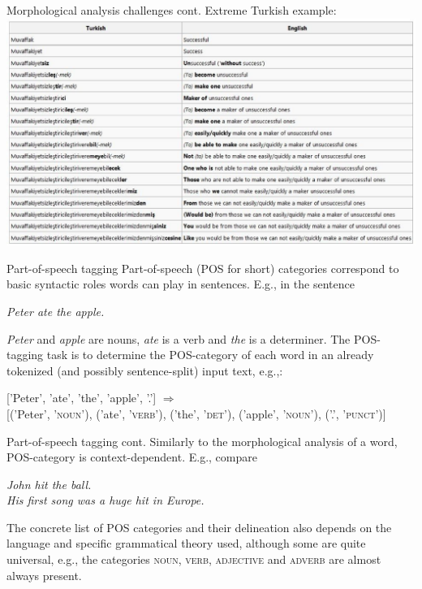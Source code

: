 \documentclass[style=upen, size=14pt]{powerdot}
\newcommand{\gold}{\color{arany}}
\begin{document}
\begin{slide}[toc=]{Morphological analysis challenges cont.}
  Extreme Turkish example:\smallskip\\
    \includegraphics[width=1\textwidth]{figures/turk.eps}
\end{slide}

\begin{slide}[toc=POS tagging]{Part-of-speech tagging}
  Part-of-speech (POS for short) categories correspond to basic syntactic roles
  words can play in sentences. E.g., in the sentence\bigskip

  \emph{Peter ate the apple.}\bigskip

  \emph{Peter} and \emph{apple} are nouns, \emph{ate} is a verb and \emph{the}
  is a determiner. The POS-tagging task is to determine the POS-category of each
  word in an already tokenized (and possibly sentence-split) input text,
  e.g.,:\bigskip

  ['Peter', 'ate', 'the', 'apple', '.'] $\Rightarrow$ \\
  
  [('Peter', \textsc{'noun'}), ('ate', \textsc{'verb'}), ('the',
  \textsc{'det'}), ('apple', \textsc{'noun'}), ('.', \textsc{'punct'})]
\end{slide}

\begin{slide}[toc=]{Part-of-speech tagging cont.}
  Similarly to the morphological analysis of a word, POS-category is
  context-dependent. E.g., compare\bigskip

  \emph{John {\gold hit} the ball.}\\
  \emph{His first song was a huge {\gold hit} in Europe.}\bigskip

  The concrete list of POS categories and their delineation also depends on the
  language and specific grammatical theory used, although some are quite
  universal, e.g., the categories \textsc{noun}, \textsc{verb},
  \textsc{adjective} and \textsc{adverb} are almost always present.
\end{slide}
\end{document}
